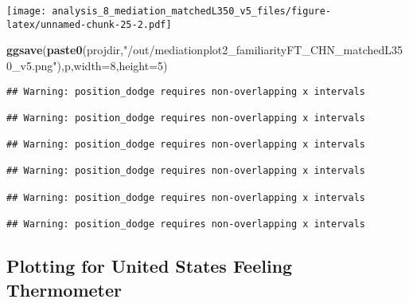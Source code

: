 \documentclass[
]{article}
\newenvironment{Shaded}{\begin{snugshade}}{\end{snugshade}}
\newcommand{\DataTypeTok}[1]{\textcolor[rgb]{0.13,0.29,0.53}{#1}}
\newcommand{\DecValTok}[1]{\textcolor[rgb]{0.00,0.00,0.81}{#1}}
\newcommand{\KeywordTok}[1]{\textcolor[rgb]{0.13,0.29,0.53}{\textbf{#1}}}
\newcommand{\NormalTok}[1]{#1}
\newcommand{\StringTok}[1]{\textcolor[rgb]{0.31,0.60,0.02}{#1}}
\begin{document}
\texttt{[image: analysis\_8\_mediation\_matchedL350\_v5\_files/figure-latex/unnamed-chunk-25-2.pdf]}

\begin{Shaded}
\begin{Highlighting}[]
\KeywordTok{ggsave}\NormalTok{(}\KeywordTok{paste0}\NormalTok{(projdir,}\StringTok{"/out/mediationplot2_familiarityFT_CHN_matchedL350_v5.png"}\NormalTok{),p,}\DataTypeTok{width=}\DecValTok{8}\NormalTok{,}\DataTypeTok{height=}\DecValTok{5}\NormalTok{)}
\end{Highlighting}
\end{Shaded}

\begin{verbatim}
## Warning: position_dodge requires non-overlapping x intervals

## Warning: position_dodge requires non-overlapping x intervals

## Warning: position_dodge requires non-overlapping x intervals

## Warning: position_dodge requires non-overlapping x intervals

## Warning: position_dodge requires non-overlapping x intervals

## Warning: position_dodge requires non-overlapping x intervals
\end{verbatim}

\hypertarget{plotting-for-united-states-feeling-thermometer}{%
\subsection{Plotting for United States Feeling
Thermometer}\label{plotting-for-united-states-feeling-thermometer}}
\end{document}
